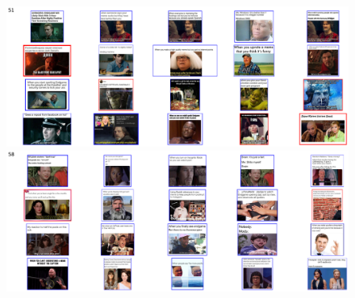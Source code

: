 \documentclass[article,36pt,extrafontsizes,oneside,openany,oldfontcommands]{memoir}
\begin{document}
\begin{adjmulticols*}{3}{0.5in}{0.5in}
\begin{adjustwidth}{0.1in}{0in}
\vspace{1.25cm}
\begin{figure}
    \includegraphics[width=\linewidth]{figure/cluster_51_half.pdf}
    \\[1cm]
    \includegraphics[width=\linewidth]{figure/cluster_58_half.pdf}
\end{figure}
\vspace{-3cm}
\end{adjustwidth}


\columnbreak



\end{adjmulticols*}
\end{document}
